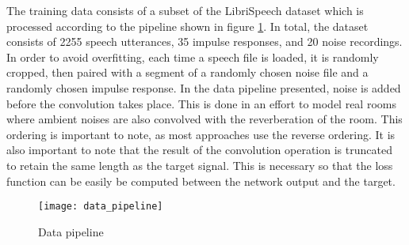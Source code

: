 The training data consists of a subset of the LibriSpeech dataset \cite{panayotov_librispeech_2015} which is processed according to the pipeline shown in figure \ref{fig:data_pipeline}. In total, the dataset consists of 2255 speech utterances, 35 impulse responses, and 20 noise recordings. In order to avoid overfitting, each time a speech file is loaded, it is randomly cropped, then paired with a segment of a randomly chosen noise file and a randomly chosen impulse response. In the data pipeline presented, noise is added before the convolution takes place. This is done in an effort to model real rooms where ambient noises are also convolved with the reverberation of the room. This ordering is important to note, as most approaches use the reverse ordering.	It is also important to note that the result of the convolution operation is truncated to retain the same length as the target signal. This is necessary so that the loss function can be easily be computed between the network output and the target.

\begin{figure}[h]
	\centering
	\texttt{[image: data\_pipeline]}
	\caption{Data pipeline}
	\label{fig:data_pipeline}
\end{figure}
